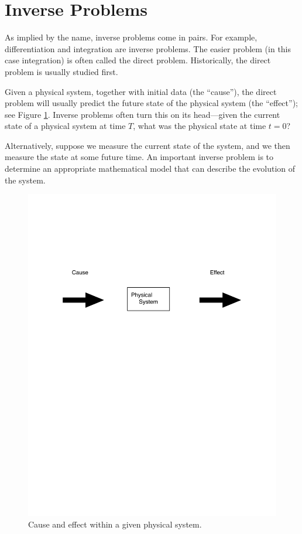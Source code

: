 \section*{Inverse Problems}
As implied by the name, inverse problems come in pairs.
For example, differentiation and integration are inverse problems.
The easier problem (in this case integration) is often called the direct problem.
Historically, the direct problem is usually studied first.

Given a physical system, together with initial data (the ``cause''), the direct problem will usually predict the future state of the physical system (the ``effect''); see Figure \ref{fig:cause_and_effect}.
Inverse problems often turn this on its head---given the current state of a physical system at time $T$, what was the physical state at time $t = 0$?  

Alternatively, suppose we measure the current state of the system, and we then measure the state at some future time.
An important inverse problem is to determine an appropriate mathematical model that can describe the evolution of the system.

\begin{figure}
\centering
\includegraphics[width=\textwidth]{figures/cause_and_effect.pdf}
\caption{Cause and effect within a given physical system.}
\label{fig:cause_and_effect}
\end{figure}

